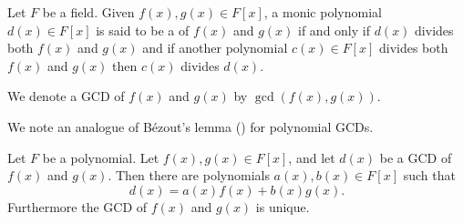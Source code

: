 \begin{definition}
    Let $F$ be a field. Given $f(x), g(x) \in F[x]$, a monic polynomial $d(x) \in F[x]$ is said to be a  of $f(x)$ and $g(x)$ if and only if $d(x)$ divides both $f(x)$ and $g(x)$ and if another polynomial $c(x) \in F[x]$ divides both $f(x)$ and $g(x)$ then $c(x)$ divides $d(x)$.

    We denote a GCD of $f(x)$ and $g(x)$ by $\gcd(f(x), g(x))$.
\end{definition}

We note an analogue of B\'ezout's lemma () for polynomial GCDs.

\begin{theorem}\label{thrm-bezout-lemma-for-polynomials}
    Let $F$ be a polynomial. Let $f(x), g(x) \in F[x]$, and let $d(x)$ be a GCD of $f(x)$ and $g(x)$. Then there are polynomials $a(x), b(x) \in F[x]$ such that
    \[
        d(x) = a(x)f(x) + b(x)g(x).
    \]
    Furthermore the GCD of $f(x)$ and $g(x)$ is unique.
\end{theorem}
